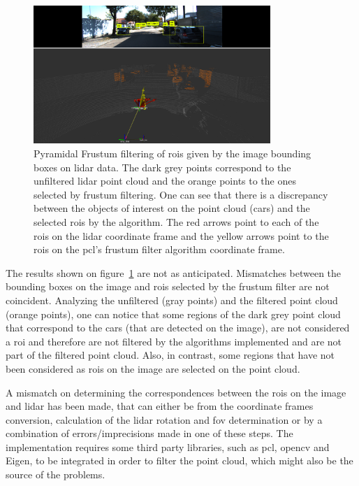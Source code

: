 \begin{figure}[ht]
	\centering
	\includegraphics[width=0.8\textwidth]{img/image-object-to-point-cloud/bbox_correspondences_on_kitti.png}
	\caption{Pyramidal Frustum filtering of \acp{roi} given by the image bounding boxes on \ac{lidar} data. The dark grey points correspond to the unfiltered \ac{lidar} point cloud and the orange points to the ones selected by frustum filtering. One can see that there is a discrepancy between the objects of interest on the point cloud (cars) and the selected \acp{roi} by the algorithm. The red arrows point to each of the \acp{roi} on the \ac{lidar} coordinate frame and the yellow arrows point to the \acp {roi} on the \ac{pcl}'s frustum filter algorithm coordinate frame.}
	\label{fig:bbox-correspondences-on-kitti}
\end{figure}

The results shown on figure~\ref{fig:bbox-correspondences-on-kitti} are not as anticipated. Mismatches between the bounding boxes on the image and \acp{roi} selected by the frustum filter are not coincident. Analyzing the unfiltered (gray points) and the filtered point cloud (orange points), one can notice that some regions of the dark grey point cloud that correspond to the cars (that are detected on the image), are not considered a \ac{roi} and therefore are not filtered by the algorithms implemented and are not part of the filtered point cloud. Also, in contrast, some regions that have not been considered as \acp{roi} on the image are selected on the point cloud.

A mismatch on determining the correspondences between the \acp{roi} on the image and \ac{lidar} has been made, that can either be from the coordinate frames conversion, calculation of the \ac{lidar} rotation and \ac{fov} determination or by a combination of errors/imprecisions made in one of these steps. The implementation requires some third party libraries, such as \ac{pcl}, \ac{opencv} and Eigen, to be integrated in order to filter the point cloud, which might also be the source of the problems.

